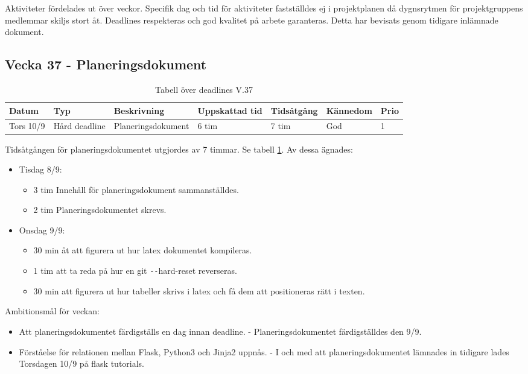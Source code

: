 \documentclass{TDP003mall}
\begin{document}
 Aktiviteter fördelades ut över veckor. Specifik dag och tid för aktiviteter fastställdes ej i projektplanen då dygnsrytmen för projektgruppens medlemmar skiljs stort åt. Deadlines respekteras och god kvalitet på arbete garanteras. Detta har bevisats genom tidigare inlämnade dokument.

 \subsection*{Vecka 37 - Planeringsdokument}

 \begin{table}[h!]
   \begin{tabularx}{\linewidth}{|l|l|X|l|l|l|l|}
  \hline
  Datum     & Typ           & Beskrivning        & Uppskattad tid & Tidsåtgång & Kännedom & Prio \\ [0.5ex]
  \hline                                             
  Tors 10/9 & Hård deadline & Planeringsdokument & 6 tim          & 7 tim      & God      & 1    \\
  \hline
   \end{tabularx}
   \caption{Tabell över deadlines V.37\label{tab:2}}
   \label{tab:2}
\end{table}

Tidsåtgången för planeringsdokumentet utgjordes av 7 timmar. Se tabell \ref{tab:2}. Av dessa ägnades:
\begin{itemize}
  \item Tisdag 8/9:
  \begin{itemize}
    \item 3 tim Innehåll för planeringsdokument sammanställdes.
    \item 2 tim Planeringsdokumentet skrevs.
  \end{itemize}
  \item Onsdag 9/9:
  \begin{itemize}
    \item 30 min åt att figurera ut hur latex dokumentet kompileras.
    \item 1 tim att ta reda på hur en git \texttt{-{}-}hard-reset reverseras.
    \item 30 min att figurera ut hur tabeller skrivs i latex och få dem att positioneras rätt i texten.\\
  \end{itemize}
      \end{itemize}

      Ambitionsmål för veckan:
      \begin{itemize}
      \item Att planeringsdokumentet färdigställs en dag innan deadline. - Planeringsdokumentet färdigställdes den 9/9.
      \item Förståelse för relationen mellan Flask, Python3 och Jinja2 uppnås. - I och med att planeringsdokumentet lämnades in tidigare lades Torsdagen 10/9 på flask tutorials.
      \end{itemize}
      
\end{document}
